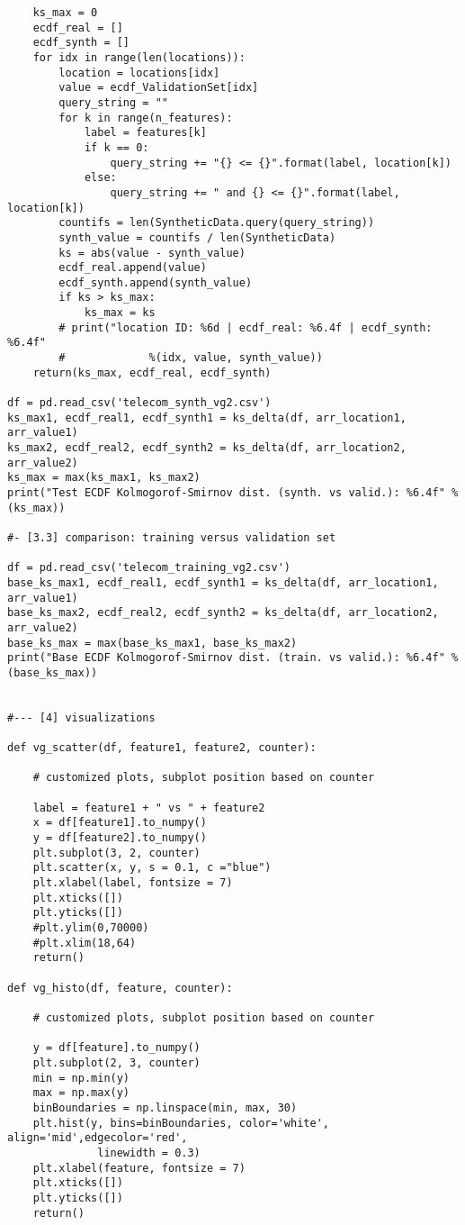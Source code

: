 \documentclass[oneside,10pt]{book}
\begin{document}
\begin{lstlisting}
    ks_max = 0
    ecdf_real = []
    ecdf_synth = []
    for idx in range(len(locations)):
        location = locations[idx]
        value = ecdf_ValidationSet[idx]
        query_string = ""
        for k in range(n_features):
            label = features[k]
            if k == 0:
                query_string += "{} <= {}".format(label, location[k])
            else: 
                query_string += " and {} <= {}".format(label, location[k])
        countifs = len(SyntheticData.query(query_string))
        synth_value = countifs / len(SyntheticData)
        ks = abs(value - synth_value)
        ecdf_real.append(value)
        ecdf_synth.append(synth_value)
        if ks > ks_max:
            ks_max = ks
        # print("location ID: %6d | ecdf_real: %6.4f | ecdf_synth: %6.4f"
        #             %(idx, value, synth_value))
    return(ks_max, ecdf_real, ecdf_synth)

df = pd.read_csv('telecom_synth_vg2.csv')
ks_max1, ecdf_real1, ecdf_synth1 = ks_delta(df, arr_location1, arr_value1)
ks_max2, ecdf_real2, ecdf_synth2 = ks_delta(df, arr_location2, arr_value2)
ks_max = max(ks_max1, ks_max2)
print("Test ECDF Kolmogorof-Smirnov dist. (synth. vs valid.): %6.4f" %(ks_max))

#- [3.3] comparison: training versus validation set

df = pd.read_csv('telecom_training_vg2.csv')
base_ks_max1, ecdf_real1, ecdf_synth1 = ks_delta(df, arr_location1, arr_value1)
base_ks_max2, ecdf_real2, ecdf_synth2 = ks_delta(df, arr_location2, arr_value2)
base_ks_max = max(base_ks_max1, base_ks_max2)
print("Base ECDF Kolmogorof-Smirnov dist. (train. vs valid.): %6.4f" %(base_ks_max))


#--- [4] visualizations

def vg_scatter(df, feature1, feature2, counter):

    # customized plots, subplot position based on counter

    label = feature1 + " vs " + feature2
    x = df[feature1].to_numpy()
    y = df[feature2].to_numpy()
    plt.subplot(3, 2, counter)
    plt.scatter(x, y, s = 0.1, c ="blue")
    plt.xlabel(label, fontsize = 7)
    plt.xticks([])
    plt.yticks([])
    #plt.ylim(0,70000)
    #plt.xlim(18,64)
    return()

def vg_histo(df, feature, counter):

    # customized plots, subplot position based on counter

    y = df[feature].to_numpy()
    plt.subplot(2, 3, counter)
    min = np.min(y)
    max = np.max(y)
    binBoundaries = np.linspace(min, max, 30)
    plt.hist(y, bins=binBoundaries, color='white', align='mid',edgecolor='red',
              linewidth = 0.3) 
    plt.xlabel(feature, fontsize = 7)
    plt.xticks([])
    plt.yticks([])
    return()


\end{lstlisting}
\end{document}
